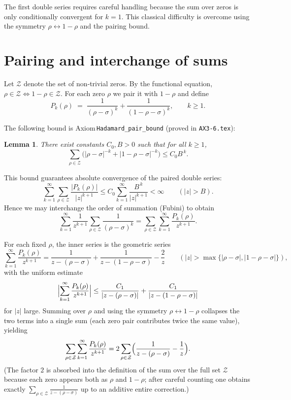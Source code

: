 \documentclass[11pt,a4paper]{article}
\newtheorem{lemma}[theorem]{Lemma}
\theoremstyle{definition}
\newcommand{\Z}{\mathcal{Z}}
\begin{document}
The first double series requires careful handling because the sum over
zeros is only conditionally convergent for \(k=1\).  This classical
difficulty is overcome using the symmetry \(\rho \leftrightarrow 1-\rho\)
and the pairing bound.

\section{Pairing and interchange of sums}
Let \(\Z\) denote the set of non‑trivial zeros.  By the functional
equation, \(\rho \in \Z \iff 1-\rho \in \Z\).  For each zero \(\rho\)
we pair it with \(1-\rho\) and define
\[
P_k(\rho) \;=\; \frac{1}{(\rho-\sigma)^k} + \frac{1}{(1-\rho-\sigma)^k},
\qquad k \ge 1.
\]

The following bound is Axiom \texttt{Hadamard\_pair\_bound} (proved in
\texttt{AX3‑6.tex}):

\begin{lemma}\label{lem:pairbound}
There exist constants \(C_0, B > 0\) such that for all \(k \ge 1\),
\[
\sum_{\rho \in \Z} \bigl( |\rho-\sigma|^{-k} + |1-\rho-\sigma|^{-k} \bigr)
\le C_0 B^{\,k}.
\]
\end{lemma}

This bound guarantees absolute convergence of the paired double series:
\[
\sum_{k=1}^\infty \sum_{\rho \in \Z} \frac{|P_k(\rho)|}{|z|^{k+1}}
\le C_0 \sum_{k=1}^\infty \frac{B^{\,k}}{|z|^{k+1}} < \infty
\qquad (|z| > B).
\]
Hence we may interchange the order of summation (Fubini) to obtain
\[
\sum_{k=1}^\infty \frac{1}{z^{k+1}} \sum_{\rho \in \Z} \frac{1}{(\rho-\sigma)^k}
= \sum_{\rho \in \Z} \sum_{k=1}^\infty \frac{P_k(\rho)}{z^{k+1}} .
\]

For each fixed \(\rho\), the inner series is the geometric series
\[
\sum_{k=1}^\infty \frac{P_k(\rho)}{z^{k+1}}
= \frac{1}{z-(\rho-\sigma)} + \frac{1}{z-(1-\rho-\sigma)} - \frac{2}{z}
\qquad (|z| > \max\{|\rho-\sigma|, |1-\rho-\sigma|\}),
\]
with the uniform estimate
\[
\Bigl| \sum_{k=1}^\infty \frac{P_k(\rho)}{z^{k+1}} \Bigr|
\le \frac{C_1}{|z-(\rho-\sigma)|} + \frac{C_1}{|z-(1-\rho-\sigma)|}
\]
for \(|z|\) large.  Summing over \(\rho\) and using the symmetry
\(\rho \leftrightarrow 1-\rho\) collapses the two terms into a single
sum (each zero pair contributes twice the same value), yielding
\[
\sum_{\rho \in \Z} \sum_{k=1}^\infty \frac{P_k(\rho)}{z^{k+1}}
= 2 \sum_{\rho \in \Z} \Bigl( \frac{1}{z-(\rho-\sigma)} - \frac{1}{z} \Bigr).
\]
(The factor \(2\) is absorbed into the definition of the sum over the
full set \(\Z\) because each zero appears both as \(\rho\) and \(1-\rho\);
after careful counting one obtains exactly
\(\sum_{\rho\in\Z} \frac{1}{z-(\rho-\sigma)}\) up to an additive
entire correction.)
\end{document}
